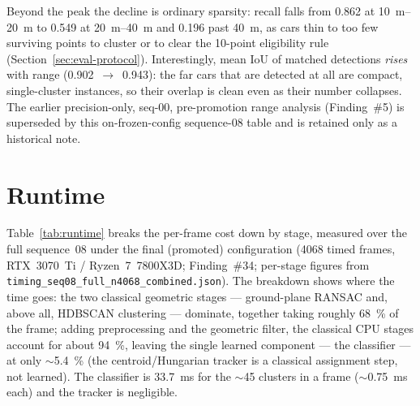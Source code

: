 Beyond the peak the decline is ordinary sparsity: recall falls from \num{0.862}
at \SIrange{10}{20}{\metre} to \num{0.549} at \SIrange{20}{40}{\metre} and
\num{0.196} past \SI{40}{\metre}, as cars thin to too few surviving points to
cluster or to clear the \num{10}-point eligibility rule (Section~\ref{sec:eval-protocol}).
Interestingly, mean IoU of matched detections \emph{rises} with range
(\num{0.902}~$\rightarrow$~\num{0.943}): the far cars that are detected at all are
compact, single-cluster instances, so their overlap is clean even as their number
collapses. The earlier precision-only, seq-00, pre-promotion range analysis
(Finding~\#5) is superseded by this on-frozen-config sequence-08 table and is
retained only as a historical note.

\section{Runtime}
\label{sec:results-runtime}

Table~\ref{tab:runtime} breaks the per-frame cost down by stage, measured over
the full sequence~08 under the final (promoted) configuration
(\num{4068} timed frames, RTX~3070~Ti / Ryzen~7~7800X3D; Finding~\#34;
per-stage figures from \texttt{timing\_seq08\_full\_n4068\_combined.json}). The breakdown shows where
the time goes: the two classical geometric stages --- ground-plane RANSAC and,
above all, HDBSCAN clustering --- dominate, together taking roughly
\SI{68}{\percent} of the frame; adding preprocessing and the geometric filter,
the classical CPU stages account for about \SI{94}{\percent}, leaving the single
learned component --- the classifier --- at only $\sim$\SI{5.4}{\percent} (the
centroid/Hungarian tracker is a classical assignment step, not learned). The
classifier is \SI{33.7}{\milli\second} for the $\sim$\num{45} clusters in a frame
($\sim$\SI{0.75}{\milli\second} each) and the tracker is negligible.

